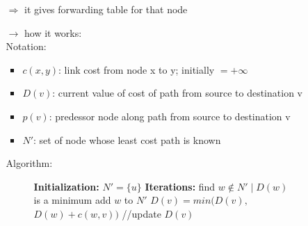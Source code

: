 \begin{itemize}
\begin{itemize}
        $\Rightarrow$ it gives forwarding table for that node
        \item[$\rightarrow$] how it works:\\[0.2cm]
        Notation:
        \begin{itemize}
            \item $c(x,y)$: link cost from node x to y; initially $= + \infty$
            \item $D(v)$: current value of cost of path from source to destination v
            \item $p(v)$: predessor node along path from source to destination v
            \item $N'$: set of node whose least cost path is known
        \end{itemize}
        \newpage
        Algorithm:
        \vspace*{-0.5cm}
        \begin{figure}[!h]
            \centering
            \begin{minipage}{.75\linewidth}
                \begin{algorithm}[H]
                    \captionsetup{labelformat=empty}
                    \begin{algorithmic}[1]
                    \State \textbf{Initialization:}
                    \State $N' = \{u\}$
                        \Else 
                        \EndIf
                    \EndFor
                    \State
                    \State \textbf{Iterations:}
                    \Repeat 
                    \State find $w \notin N' \mid D(w)$ is a minimum
                    \State add $w$ to $N'$
                        \State $D(v) = min(D(v),$ $D(w) + c(w,v))$ //update $D(v)$
                    \EndFor
                    \end{algorithmic}
                \end{algorithm}
            \end{minipage}
        \end{figure}
    \end{itemize}
\end{itemize}

